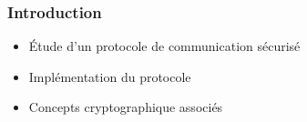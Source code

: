 \begin{frame}
\frametitle{Introduction}
\begin{itemize}
\item Étude d'un protocole de communication sécurisé
\item Implémentation du protocole
\item Concepts cryptographique associés
\end{itemize}
\end{frame}
